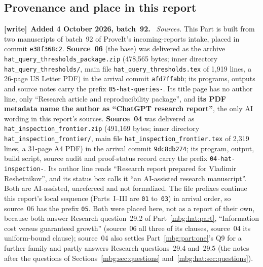 \documentclass[11pt,letterpaper]{article}
\theoremstyle{definition}
\newenvironment{writenote}[1][]{\par\smallskip\begingroup\small
 \noindent\textbf{[write]}\if\relax\detokenize{#1}\relax\else~\textbf{#1.}\fi\ }%
 {\par\endgroup\smallskip}
\begin{document}
\subsection{Provenance and place in this report}
\label{mbg:qry:sec:provenance}

\begin{writenote}[Added 4 October 2026, batch~92]
\emph{Sources.} This Part is built from two manuscripts of batch~92 of ProveIt's incoming-reports intake, placed in commit \texttt{e38f368c2}. \textbf{Source~06} (the base) was delivered as the archive \texttt{hat\_\allowbreak query\_\allowbreak thresholds\_\allowbreak package.zip} (478,565 bytes; inner directory \texttt{hat\_\allowbreak query\_\allowbreak thresholds/}, main file \texttt{hat\_\allowbreak query\_\allowbreak thresholds.tex} of 1,919 lines, a 26-page US Letter PDF) in the arrival commit \texttt{afd7ffabb}; its programs, outputs and source notes carry the prefix \texttt{05-hat-queries-}. Its title page has no author line, only ``Research article and reproducibility package'', and \textbf{its PDF metadata name the author as ``ChatGPT research report''}, the only AI wording in this report's sources. \textbf{Source~04} was delivered as \texttt{hat\_\allowbreak inspection\_\allowbreak frontier.zip} (491,169 bytes; inner directory \texttt{hat\_\allowbreak inspection\_\allowbreak frontier/}, main file \texttt{hat\_\allowbreak inspection\_\allowbreak frontier.tex} of 2,319 lines, a 31-page A4 PDF) in the arrival commit \texttt{9dc8db274}; its program, output, build script, source audit and proof-status record carry the prefix \texttt{04-hat-inspection-}. Its author line reads ``Research report prepared for Vladimir Reshetnikov'', and its status box calls it ``an AI-assisted research manuscript''. Both are AI-assisted, unrefereed and not formalized. The file prefixes continue this report's local sequence (Parts~I--III are \texttt{01} to~\texttt{03}) in arrival order, so source~06 has the prefix \texttt{05}. Both were placed here, not as a report of their own, because both answer Research question~29.2 of Part~\ref{mbg:hat:part}, ``Information cost versus guaranteed growth'' (source~06 all three of its clauses, source~04 its uniform-bound clause); source~04 also settles Part~\ref{mbg:part:one}'s Q9 for a further family and partly answers Research questions~29.4 and~29.5 (the notes after the questions of Sections~\ref{mbg:sec:questions} and~\ref{mbg:hat:sec:questions}).


\end{writenote}
\end{document}
